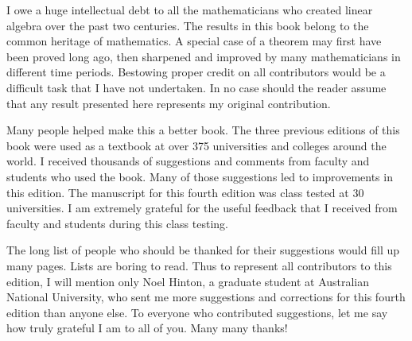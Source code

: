 {I owe a huge intellectual debt to all the mathematicians who created linear algebra over the past two centuries. The results in this book belong to the common heritage of mathematics.  A special case of a theorem may first have been proved long ago, then sharpened and improved by many mathematicians in different time periods.  Bestowing proper credit on all contributors would be a difficult task that I have not undertaken. In no case should the reader assume that any result presented here represents my original contribution.

Many people helped make this a better book. The three previous editions of this book were used as a textbook at over 375 universities and colleges around the world. I received thousands of suggestions and comments from faculty and students who used the book. Many of those suggestions led to improvements in this edition. The manuscript for this fourth edition was class tested at 30 universities. I am extremely grateful for the useful feedback that I received from faculty and students during this class testing.

The long list of people who should be thanked for their suggestions would fill up many pages. Lists are boring to read. Thus to represent all contributors to this edition, I will mention only Noel Hinton, a graduate student at Australian National University, who sent me more suggestions and corrections for this fourth edition than anyone else. To everyone who contributed suggestions, let me say how truly grateful I am to all of you. Many many thanks!

}
